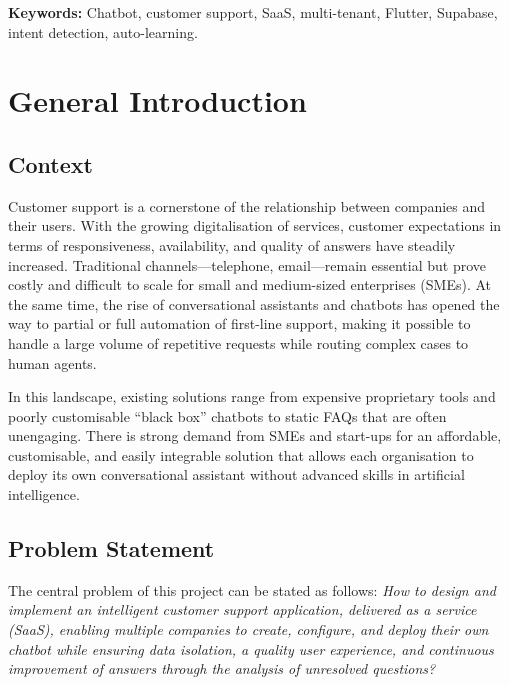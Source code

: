 \documentclass[12pt,a4paper]{report}
\begin{document}
\textbf{Keywords:} Chatbot, customer support, SaaS, multi-tenant, Flutter, Supabase, intent detection, auto-learning.

\tableofcontents

\chapter{General Introduction}

\section{Context}

Customer support is a cornerstone of the relationship between companies and their users. With the growing digitalisation of services, customer expectations in terms of responsiveness, availability, and quality of answers have steadily increased. Traditional channels---telephone, email---remain essential but prove costly and difficult to scale for small and medium-sized enterprises (SMEs). At the same time, the rise of conversational assistants and chatbots has opened the way to partial or full automation of first-line support, making it possible to handle a large volume of repetitive requests while routing complex cases to human agents.

In this landscape, existing solutions range from expensive proprietary tools and poorly customisable ``black box'' chatbots to static FAQs that are often unengaging. There is strong demand from SMEs and start-ups for an affordable, customisable, and easily integrable solution that allows each organisation to deploy its own conversational assistant without advanced skills in artificial intelligence.

\section{Problem Statement}

The central problem of this project can be stated as follows: \textit{How to design and implement an intelligent customer support application, delivered as a service (SaaS), enabling multiple companies to create, configure, and deploy their own chatbot while ensuring data isolation, a quality user experience, and continuous improvement of answers through the analysis of unresolved questions?}
\end{document}
